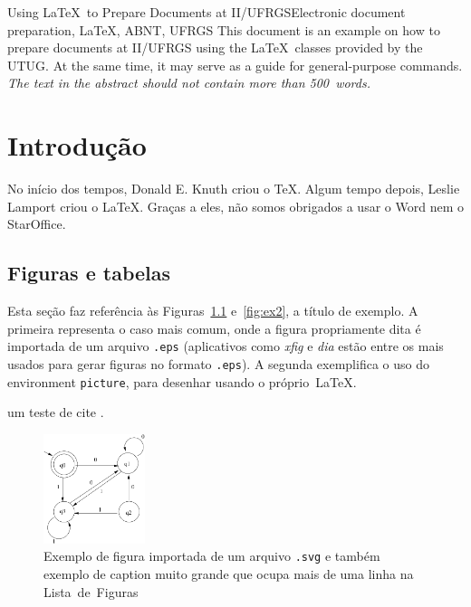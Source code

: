 \documentclass[tc,cic,openright,english]{iiufrgs}
\begin{document}
\begin{englishabstract}{Using \LaTeX\ to Prepare Documents at II/UFRGS}{Electronic document preparation, \LaTeX, ABNT, UFRGS}
This document is an example on how to prepare documents at II/UFRGS
using the \LaTeX\ classes provided by the UTUG\@. At the same time, it
may serve as a guide for general-purpose commands. \emph{The text in
the abstract should not contain more than 500~words.}
\end{englishabstract}


\chapter{Introdução}

No início dos tempos, Donald E. Knuth criou o \TeX. Algum tempo depois, Leslie Lamport criou o \LaTeX. Graças a eles, não somos obrigados a usar o Word nem o StarOffice.

\section{Figuras e tabelas}

Esta seção faz referência às Figuras~\ref{fig:ex1} e~\ref{fig:ex2}, a título de exemplo. A primeira representa o caso mais comum, onde a figura propriamente dita é importada de um arquivo \texttt{.eps} (aplicativos como \emph{xfig} e \emph{dia} estão entre os mais usados para gerar figuras no formato \texttt{.eps}). A segunda exemplifica o uso do environment \texttt{picture}, para desenhar usando o próprio~\LaTeX.


um teste de cite \citep{kastenholz} .

\begin{figure}
        \centerline{
            \includegraphics[width=8em]{fig.pdf}
        }
        \caption{Exemplo de figura importada de um arquivo \texttt{.svg} e também exemplo de caption muito grande que ocupa mais de uma linha na Lista~de~Figuras}
        \label{fig:ex1}
\end{figure}
\end{document}
